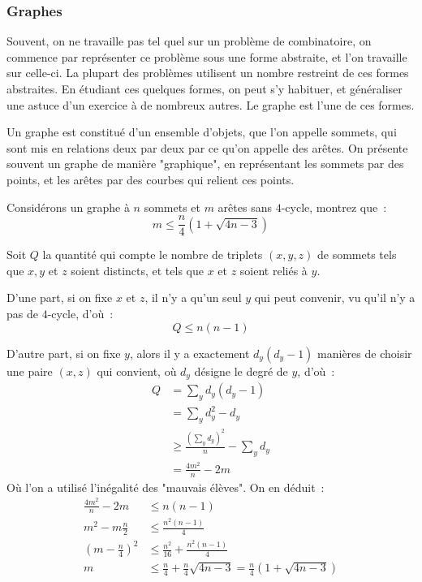 \subsubsection{Graphes}

Souvent, on ne travaille pas tel quel sur un problème de combinatoire, on commence par représenter ce problème sous une forme abstraite, et l'on travaille sur celle-ci. La plupart des problèmes utilisent un nombre restreint de ces formes abstraites. En étudiant ces quelques formes, on peut s'y habituer, et généraliser une astuce d'un exercice à de nombreux autres. Le graphe est l'une de ces formes.

Un graphe est constitué d'un ensemble d'objets, que l'on appelle sommets, qui sont mis en relations deux par deux par ce qu'on appelle des arêtes. On présente souvent un graphe de manière "graphique", en représentant les sommets par des points, et les arêtes par des courbes qui relient ces points.

\begin{exo}
	Considérons un graphe à $n$ sommets et $m$ arêtes sans $4$-cycle, montrez que~:
	$$m \le \frac{n}{4}(1 + \sqrt{4n - 3})$$
\end{exo}
\begin{sol}
	Soit $Q$ la quantité qui compte le nombre de triplets $(x, y, z)$ de sommets tels que $x, y$ et $z$ soient distincts, et tels que $x$ et $z$ soient reliés à $y$.
	
	D'une part, si on fixe $x$ et $z$, il n'y a qu'un seul $y$ qui peut convenir, vu qu'il n'y a pas de $4$-cycle, d'où~:
	$$Q \le n(n - 1)$$
	
	D'autre part, si on fixe $y$, alors il y a exactement $d_y(d_y - 1)$ manières de choisir une paire $(x, z)$ qui convient, où $d_y$ désigne le degré de $y$, d'où~:
	\begin{align*}
	Q &= \sum_y d_y(d_y - 1) \\
	&= \sum_y d_y^2 - d_y \\
	&\ge \frac{\left(\sum_y d_y\right)^2}{n} - \sum_y d_y \\
	&= \frac{4m^2}{n} - 2m
	\end{align*}
	Où l'on a utilisé l'inégalité des "mauvais élèves".
	On en déduit~:
	\begin{align*}
	\frac{4m^2}{n} - 2m &\le n(n - 1) \\
	m^2 - m\frac{n}2 &\le \frac{n^2(n - 1)}{4} \\
	\left (m - \frac{n}{4} \right )^2 &\le \frac{n^2}{16} + \frac{n^2(n - 1)}{4} \\
	m &\le \frac{n}{4} + \frac{n}{4} \sqrt{4n - 3} = \frac{n}{4}(1 + \sqrt{4n - 3})
	\end{align*}
\end{sol}

